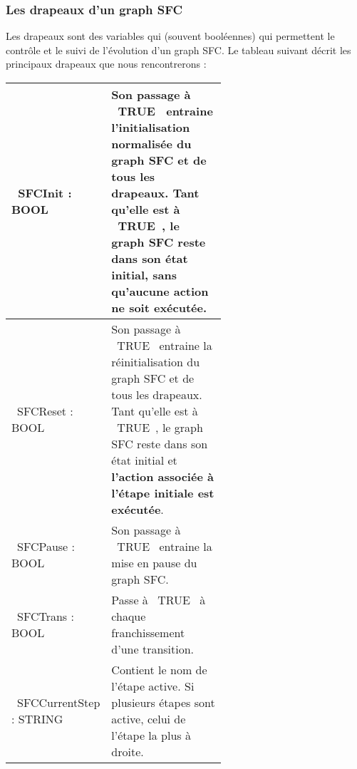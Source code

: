 \subsubsection{Les drapeaux d'un graph SFC}
Les drapeaux sont des variables qui (souvent booléennes) qui permettent le contrôle et le suivi de l'évolution d'un graph SFC. 
Le tableau suivant décrit les principaux drapeaux que nous rencontrerons : 
\begin{center}
    \begin{tabular}[t]{l|p{0.6\linewidth}}
        \hline
        ~SFCInit : BOOL~ & Son passage à ~TRUE~ entraine l'initialisation normalisée du graph SFC et de tous les drapeaux. Tant qu'elle est à ~TRUE~, le graph SFC reste dans son état initial, sans qu'aucune action ne soit exécutée.\\\hline
        ~SFCReset : BOOL~ & Son passage à ~TRUE~ entraine la réinitialisation du graph SFC et de tous les drapeaux. Tant qu'elle est à ~TRUE~, le graph SFC reste dans son état initial et \textbf{l'action associée à l'étape initiale est exécutée}.\\\hline
        ~SFCPause : BOOL~ & Son passage à ~TRUE~ entraine la mise en pause du graph SFC. \\\hline    
        ~SFCTrans : BOOL~ & Passe à ~TRUE~ à chaque franchissement d'une transition. \\\hline
        ~SFCCurrentStep : STRING~ & Contient le nom de l'étape active. Si plusieurs étapes sont active, celui de l'étape la plus à droite. \\\hline
    \end{tabular}
\end{center}


